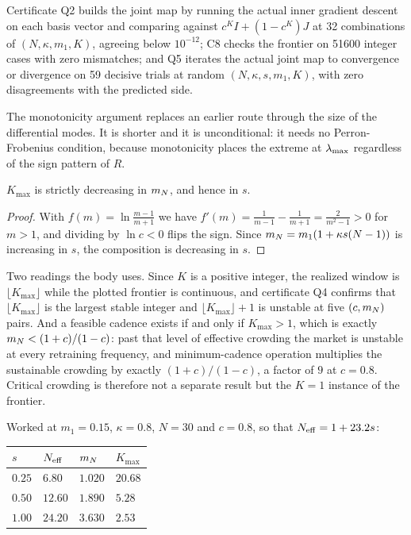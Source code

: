 Certificate Q2 builds the joint map by running the actual inner gradient descent on each basis vector and comparing against $c^KI + (1-c^K)J$ at 32 combinations of $(N,\kappa,m_1,K)$, agreeing below $10^{-12}$; C8 checks the frontier on 51600 integer cases with zero mismatches; and Q5 iterates the actual joint map to convergence or divergence on 59 decisive trials at random $(N,\kappa,s,m_1,K)$, with zero disagreements with the predicted side.

The monotonicity argument replaces an earlier route through the size of the differential modes. It is shorter and it is unconditional: it needs no Perron-Frobenius condition, because monotonicity places the extreme at $\lambda_{\max}$ regardless of the sign pattern of $R$.

\begin{acorollary}
\label{acor:kmono}
$K_{\max}$ is strictly decreasing in $m_N$, and hence in $s$.
\end{acorollary}

\begin{proof}
With $f(m) = \ln\frac{m-1}{m+1}$ we have $f'(m) = \frac{1}{m-1}-\frac{1}{m+1} = \frac{2}{m^2-1} > 0$ for $m>1$, and dividing by $\ln c < 0$ flips the sign. Since $m_N = m_1(1+\kappa s(N-1))$ is increasing in $s$, the composition is decreasing in $s$.
\end{proof}

Two readings the body uses. Since $K$ is a positive integer, the realized window is $\lfloor K_{\max}\rfloor$ while the plotted frontier is continuous, and certificate Q4 confirms that $\lfloor K_{\max}\rfloor$ is the largest stable integer and $\lfloor K_{\max}\rfloor + 1$ is unstable at five $(c,m_N)$ pairs. And a feasible cadence exists if and only if $K_{\max} > 1$, which is exactly $m_N < (1+c)/(1-c)$: past that level of effective crowding the market is unstable at every retraining frequency, and minimum-cadence operation multiplies the sustainable crowding by exactly $(1+c)/(1-c)$, a factor of $9$ at $c=0.8$. Critical crowding is therefore not a separate result but the $K=1$ instance of the frontier.

Worked at $m_1 = 0.15$, $\kappa=0.8$, $N=30$ and $c=0.8$, so that $N_{\mathrm{eff}} = 1+23.2s$:

\begin{center}
\small
\begin{tabular}{llll}
\toprule
$s$ & $N_{\mathrm{eff}}$ & $m_N$ & $K_{\max}$ \\
\midrule
$0.25$ & $6.80$ & $1.020$ & $20.68$ \\
$0.50$ & $12.60$ & $1.890$ & $5.28$ \\
$1.00$ & $24.20$ & $3.630$ & $2.53$ \\
\bottomrule
\end{tabular}
\end{center}

